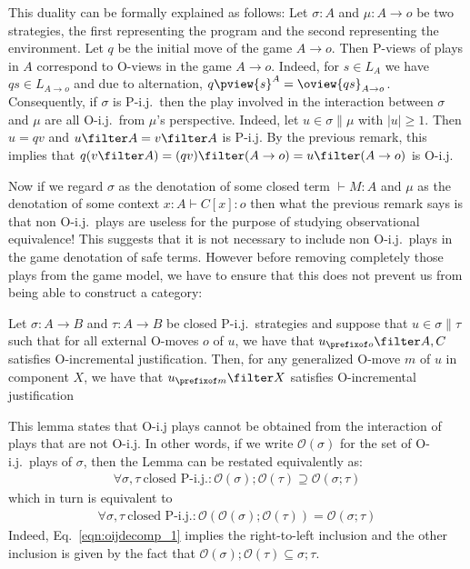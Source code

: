 This duality can be formally explained as follows: Let $\sigma : A$
and $\mu : A \rightarrow o$ be two strategies, the first
representing the program and the second representing the
environment. Let $q$ be the initial move of the game $A \rightarrow
o$. Then P-views of plays in $A$ correspond to O-views in the game
$A \rightarrow o$. Indeed, for $s\in L_A$ we have $q s \in L_{A
\rightarrow o}$ and due to alternation, $q \pview{s}^A = \oview{q s
}_{A \rightarrow o}$. Consequently, if $\sigma$ is P-i.j.\ then the
play involved in the interaction between $\sigma$ and $\mu$ are all
O-i.j.\ from $\mu$'s perspective. Indeed, let $u \in \sigma \| \mu$
with $|u|\geq1$. Then $u=q v$ and $u\filter A = v \filter A$ is
P-i.j. By the previous remark, this implies that $q (v\filter A) =
(q v)\filter (A \rightarrow o) = u \filter (A \rightarrow o)$ is
O-i.j.
\smallskip

Now if we regard $\sigma$ as the denotation of some closed term
$\vdash M:A$ and $\mu$ as the denotation of some context $x:A \vdash
C[x]:o$ then what the previous remark says is that non O-i.j.\ plays
are useless for the purpose of studying observational equivalence!
This suggests that it is not necessary to include non O-i.j.\ plays
in the game denotation of safe terms. However before removing
completely those plays from the game model, we have to ensure that
this does not prevent us from being able to construct a category:
\begin{lemma}
\label{lem:oij_decomp}
Let $\sigma : A\rightarrow B$ and $\tau : A\rightarrow B$ be closed P-i.j.\ strategies and suppose
that $u\in \sigma \| \tau$ such that for all external O-moves $o$ of $u$, we have that $u_{\prefixof o} \filter A,C$ satisfies
O-incremental justification. Then, for any generalized O-move $m$ of $u$ in component $X$, we have that
$u_{\prefixof m} \filter X$ satisfies O-incremental justification
\end{lemma}

 This lemma states that O-i.j plays cannot be obtained from
the interaction of plays that are not O-i.j. In other words, if we
write $\mathcal{O}(\sigma)$ for the set of O-i.j.\ plays of
$\sigma$, then the Lemma can be restated equivalently as:
\begin{eqnarray}
     \forall \sigma, \tau\ \mbox{closed P-i.j.}: \mathcal{O}(\sigma) ; \mathcal{O}(\tau) \supseteq \mathcal{O}(\sigma ; \tau)
     \label{eqn:oijdecomp_1}
\end{eqnarray}
which in turn is equivalent to
\begin{eqnarray}
    \forall \sigma, \tau\ \mbox{closed P-i.j.}: \mathcal{O}( \mathcal{O}(\sigma) ; \mathcal{O}(\tau) ) = \mathcal{O}(\sigma ; \tau)
    \label{eqn:oijdecomp_2}
\end{eqnarray}
Indeed, Eq.~\ref{eqn:oijdecomp_1} implies the right-to-left inclusion and the other inclusion
is given by the fact that $\mathcal{O}(\sigma) ; \mathcal{O}(\tau) \subseteq \sigma;\tau$.


